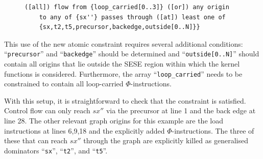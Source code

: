 \begin{figure}[h]
    \centering
    \begin{lstlisting}[language=IDL]
([all]) flow from {loop_carried[0..3]} ([or]) any origin
    to any of {sx''} passes through ([at]) least one of
    {sx,t2,t5,precursor,backedge,outside[0..N]}}
    \end{lstlisting}
\end{figure}

    \noindent
    This use of the new atomic constraint requires several additional
    conditions:
    ``{\tt precursor}'' and ``{\tt backedge}'' should be determined and
    ``{\tt outside[0..N]}'' should contain all origins that lie outside
    the SESE region within which the kernel functions is considered.
    Furthermore, the array ``{\tt loop\_carried}'' needs to be constrained to
    contain all loop-carried $\Phi$-instructions.

    With this setup, it is straightforward to check that the constraint is
    satisfied.
    Control flow can only reach $sx''$ via the precursor at line 1 and the
    back edge at line 28.
    The other relevant graph origins for this example are the load
    instructions at lines 6,9,18 and the explicitly added $\Phi$-instructions.
    The three of these that can reach $sx''$ through the graph are explicitly
    killed as generalised dominators ``{\tt sx}'', ``{\tt t2}'', and
    ``{\tt t5}''.

